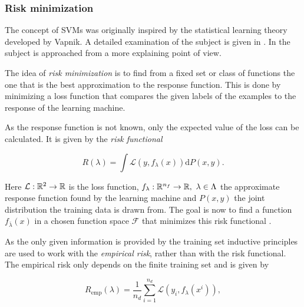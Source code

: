 \subsubsection{Risk minimization}
The concept of SVMs was originally inspired by the statistical learning theory developed by Vapnik. A detailed examination of the subject is given in \cite{Vapnik1998}. In \cite{Vapnik2013} the subject is approached from a more explaining point of view.

The idea of \emph{risk minimization} is to find from a fixed set or class of functions the one that is the best approximation to the response function. This is done by minimizing a loss function that compares the given labels of the examples to the response of the learning machine.

As the response function is not known, only the expected value of the loss can be calculated. It is given by the \emph{risk functional} 

\begin{equation}
	R(\lambda) = \int{\mathcal{L}(y,f_{\lambda}(x))\text{d}P(x,y)}.
\label{risk_func}
\end{equation}

Here \(\mathcal{L}: \mathbb{R}^2 \to \mathbb{R}\) is the loss function, \(f_{\lambda}: \mathbb{R}^{n_f} \to \mathbb{R}, ~ \lambda \in \Lambda\) the approximate response function found by the learning machine and \(P(x,y)\) the joint distribution the training data is drawn from. The goal is now to find a function \(f_{\bar{\lambda}}(x)\) in a chosen function space \(\mathcal{F}\) that minimizes this risk functional \cite[p. 989]{Vapnik1999}.

As the only given information is provided by the training set inductive principles are used to work with the \emph{empirical risk}, rather than with the risk functional.
The empirical risk only depends on the finite training set  and is given by 


\begin{equation}
	R_{\text{emp}}(\lambda) = \frac{1}{n_d} \sum_{i = 1}^{n_d}\mathcal{L}(y_i,f_{\lambda}(x^i)),
\label{emp_risk}
\end{equation}

